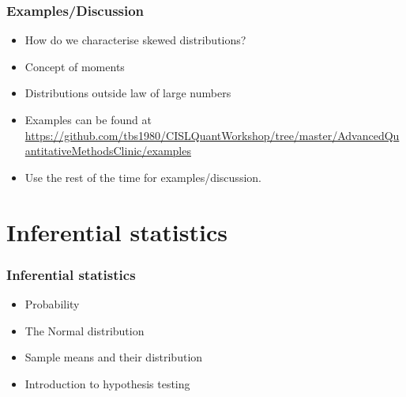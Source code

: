 \documentclass[10pt, compress]{beamer}
\begin{document}
\begin{frame}
    \frametitle{Examples/Discussion}
    \begin{itemize}
        \item \alert{How do we characterise skewed distributions?}
        \item \alert{Concept of moments}
        \item \alert{Distributions outside law of large numbers}
        \item Examples can be found at \url{https://github.com/tbs1980/CISLQuantWorkshop/tree/master/AdvancedQuantitativeMethodsClinic/examples}
        \item Use the rest of the time for examples/discussion.
    \end{itemize}
\end{frame}

\section{Inferential statistics}

\begin{frame}
    \frametitle{Inferential statistics}
    \begin{itemize}
        \item Probability
        \item The Normal distribution
        \item Sample means and their distribution
        \item Introduction to hypothesis testing
    \end{itemize}
\end{frame}
\end{document}
